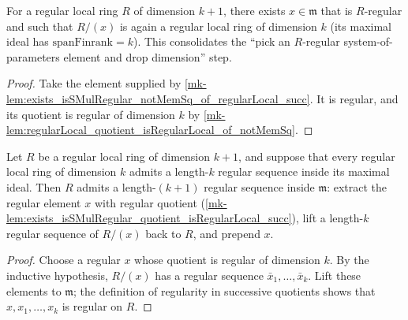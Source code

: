 \begin{lemma}\label{mk-lem:exists_isSMulRegular_quotient_isRegularLocal_succ}
  \leanok

  For a regular local ring \(R\) of dimension \(k + 1\), there exists \(x \in \mathfrak m\)
  that is \(R\)-regular and such that \(R / (x)\) is again a regular local ring of
  dimension \(k\) (its maximal ideal has \(\text{spanFinrank} = k\)). This consolidates the
  ``pick an \(R\)-regular system-of-parameters element and drop dimension'' step.
\end{lemma}
\begin{proof}
  \leanok

Take the element supplied by
  \ref{mk-lem:exists_isSMulRegular_notMemSq_of_regularLocal_succ}.
  It is regular, and its quotient is regular of dimension \(k\) by
  \ref{mk-lem:regularLocal_quotient_isRegularLocal_of_notMemSq}.
\end{proof}

\begin{lemma}\label{mk-lem:regularLocal_inductive_step}
  \leanok

  Let \(R\) be a regular local ring of dimension \(k + 1\), and suppose that every regular
  local ring of dimension \(k\) admits a length-\(k\) regular sequence inside its maximal
  ideal. Then \(R\) admits a length-\((k+1)\) regular sequence inside \(\mathfrak m\): extract
  the regular element \(x\) with regular quotient
  (\ref{mk-lem:exists_isSMulRegular_quotient_isRegularLocal_succ}), lift a length-\(k\)
  regular sequence of \(R/(x)\) back to \(R\), and prepend \(x\).
\end{lemma}
\begin{proof}
  \leanok

Choose a regular \(x\) whose quotient is regular of dimension
  \(k\). By the inductive hypothesis, \(R/(x)\) has a regular sequence
  \(\bar x_1,\ldots,\bar x_k\). Lift these elements to \(\mathfrak m\);
  the definition of regularity in successive quotients shows that
  \(x,x_1,\ldots,x_k\) is regular on \(R\).
\end{proof}

